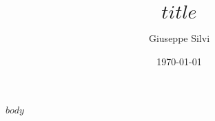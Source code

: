 \documentclass[a4paper,11pt]{article}
\title{$title$}
\author{Giuseppe Silvi}
\date{\today}
\begin{document}
\maketitle

$body$
\end{document}
